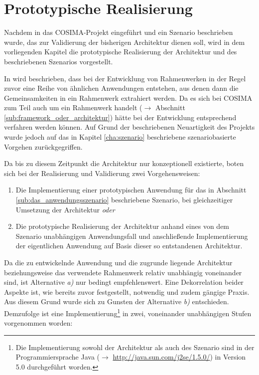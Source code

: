 
\chapter{Prototypische Realisierung} %
\label{cha:prototypische_realisierung}

  Nachdem in das COSIMA-Projekt eingeführt und ein Szenario beschrieben wurde, das zur Validierung der bisherigen Architektur dienen soll, wird in dem vorliegenden Kapitel die prototypische Realisierung der Architektur und des beschriebenen Szenarios vorgestellt.
  
  In \citep{handbuch_der_software_architektur} wird beschrieben, dass bei der Entwicklung von Rahmenwerken in der Regel zuvor eine Reihe von ähnlichen Anwendungen entstehen, aus denen dann die Gemeinsamkeiten in ein Rahmenwerk extrahiert werden. Da es sich bei COSIMA zum Teil auch um ein Rahmenwerk handelt ($\to$ Abschnitt \ref{sub:framework_oder_architektur}) hätte bei der Entwicklung entsprechend verfahren werden können. Auf Grund der beschriebenen Neuartigkeit des Projekts wurde jedoch auf das in Kapitel \ref{cha:szenario} beschriebene szenariobasierte Vorgehen zurückgegriffen.
  
  Da bis zu diesem Zeitpunkt die Architektur nur konzeptionell existierte, boten sich bei der Realisierung und Validierung zwei Vorgehensweisen:

  \begin{enumerate}[\slshape a)]
    \item Die Implementierung einer prototypischen Anwendung für das in Abschnitt \ref{sub:das_anwendungsszenario} beschriebene Szenario, bei gleichzeitiger Umsetzung der Architektur \emph{oder}
    \item Die prototypische Realisierung der Architektur anhand eines von dem Szenario unabhängigen Anwendungsfall und anschließende Implementierung der eigentlichen Anwendung auf Basis dieser so entstandenen Architektur.
  \end{enumerate}
  
  Da die zu entwickelnde Anwendung und die zugrunde liegende Architektur beziehungsweise das verwendete Rahmenwerk relativ unabhängig voneinander sind, ist Alternative \emph{a)} nur bedingt empfehlenswert. Eine Dekorrelation beider Aspekte ist, wie bereits zuvor festgestellt, notwendig und zudem gängige Praxis. Aus diesem Grund wurde sich zu Gunsten der Alternative \emph{b)} entschieden. Demzufolge ist eine Implementierung\footnote{Die Implementierung sowohl der Architektur als auch des Szenario sind in der Programmiersprache Java ($\to$ \url{http://java.sun.com/j2se/1.5.0/}) in Version 5.0 durchgeführt worden.} in zwei, voneinander unabhängigen Stufen vorgenommen worden:
  
